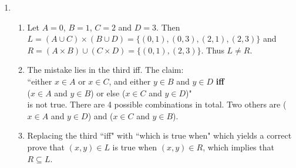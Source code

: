 \documentclass[11pt]{article}
\begin{document}
\begin{enumerate}
\begin{enumerate}
\begin{proof}
  So suppose $\exists{z}. [P(z) \land Q(z)]$. So some element $z_0 \in
  D$ such that $P(z) \land Q(z)$ is true. So there exists some $x \in
  D$ and some $y \in D$ such that $P(z) \land Q(z)$ is true. Namely,
  $x = z_0$ and $y=z_0$. That is, $[\exists{x}. P(x) \land
    \exists{y}. Q(y)]$ holds under this interpretation, as required. 
  \end{proof}
\item
  \begin{proof}
    We can prove by describing an counter model. Let the domain be the
    integers and $P(x)$ be $x > 100$, and $Q(y)$ be $y <
    50$. $[\exists{x}. P(x) \land \exists{y}. Q(y)]$ would be true
    because we can let $x = 101$ and $y = 49$. But $\exists{z}. [P(z)
      \land Q(z)]$ asserts that there exists an integer $z$ such that
    $z > 100$ while $z < 50$, which is certainly false. 
  \end{proof}
\end{enumerate}

\item %
  \begin{enumerate}
  \item
    Let $A = {0}$, $B = {1}$, $C = {2}$ and $D = {3}$. Then $L = (A
    \cup C) \times (B \cup D) = \{(0,1), (0,3), (2,1), (2,3)\}$ and $R
    = (A \times B) \cup (C \times D) = \{(0,1), (2,3)\}$. Thus $L \neq
    R$. 

  \item
    The mistake lies in the third iff. The claim: \\
    ``either $x \in A$ or $x \in C$, and either $y \in B$ and $y \in
    D$  \textbf{iff}  \\
    ($x \in A$ and $y \in B$) or else ($x \in C$ and $y \in D$)"\\
    is not true. There are 4 possible combinations in total. Two
    others are ($x \in A$ and $y \in D$) and ($x \in C$ and $y \in
    B$).

  \item
    Replacing the third ``iff" with ``which is true when" which yields
    a correct prove that $(x,y) \in L$ is true when $(x,y) \in R$,
    which implies that $R \subseteq L$.
  \end{enumerate}

\end{enumerate}
\end{document}
